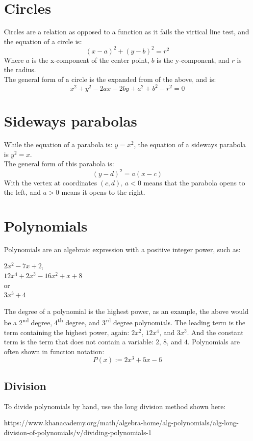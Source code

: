 \documentclass[a4paper,10pt]{report}
\begin{document}
\section{Circles}
Circles are a relation as opposed to a function as it fails the virtical line test, and the equation of a circle is:
$$
	(x - a)^2 + (y - b)^2 = r^2
$$
Where $a$ is the x-component of the center point,  $b$ is the y-component, and $r$ is the radius.\\

The general form of a circle is the expanded from of the above, and is:
$$
	x^2 + y^2 - 2ax - 2by + a^2 + b^2 -r^2 = 0
$$

\section{Sideways parabolas}
While the equation of a parabola is: $y = x^2$, the equation of a sideways parabola is $y^2 = x$.\\

The general form of this parabola is:
$$
	(y - d)^2 = a(x - c)
$$
With the vertex at coordinates $(c, d)$, $a < 0$ means that the parabola opens to the left, and $a > 0$ means it opens to the right.

\section{Polynomials}
Polynomials are an algebraic expression with a positive integer power, such as:
\begin{center}
	$2x^2 - 7x + 2$,\\
	$12x^4 + 2x^3 - 16x^2 + x + 8$\\
	or\\
	$3x^3 + 4$
\end{center}
The degree of a polynomial is the highest power, as an example, the above would be a 2\textsuperscript{nd} degree, 4\textsuperscript{th} degree, and 3\textsuperscript{rd} degree polynomials.  The leading term is the term containing the highest power, again: $2x^2$, $12x^4$, and $3x^3$.  And the constant term is the term that does not contain a variable: $2$, $8$, and $4$.  Polynomials are often shown in function notation:
$$
	P(x) := 2x^3 + 5x - 6
$$

\subsection{Division}
To divide polynomials by hand, use the long division method shown here:
\begin{center}
	https://www.khanacademy.org/math/algebra-home/alg-polynomials/alg-long-division-of-polynomials/v/dividing-polynomials-1
\end{center}
\end{document}
